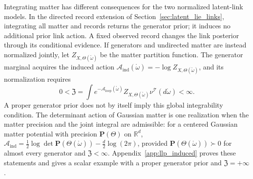 Integrating matter has different consequences for the two normalized latent-link models. In the directed record extension of Section~\ref{sec:latent_lie_links}, integrating all matter and records returns the generator prior; it induces no additional prior link action. A fixed observed record changes the link posterior through its conditional evidence. If generators and undirected matter are instead normalized jointly, let $Z_{X,\Theta(\mathring\omega)}$ be the matter partition function. The generator marginal acquires the induced action $\mathcal A_{\mathrm{ind}}(\mathring\omega)=-\log Z_{X,\Theta(\mathring\omega)}$, and its normalization requires
\begin{equation}
0<\mathfrak Z
=\int e^{-\mathcal A_{\mathrm{loop}}(\mathring\omega)}Z_{X,\Theta(\mathring\omega)}\nu^{\mathcal T}(d\mathring\omega)
<\infty.
\label{eq:pifb_joint_link_matter_normalizer}
\end{equation}
A proper generator prior does not by itself imply this global integrability condition. The determinant action of Gaussian matter is one realization when the matter precision and the joint integral are admissible: for a centered Gaussian matter potential with precision $\mathbf P(\Theta)$ on $\mathbb R^d$, $\mathcal A_{\mathrm{ind}}=\frac12\log\det\mathbf P(\Theta(\mathring\omega))-\frac d2\log(2\pi)$, provided $\mathbf P(\Theta(\mathring\omega))\succ0$ for almost every generator and $\mathfrak Z<\infty$. Appendix~\ref{app:llp_induced} proves these statements and gives a scalar example with a proper generator prior and $\mathfrak Z=+\infty$.

